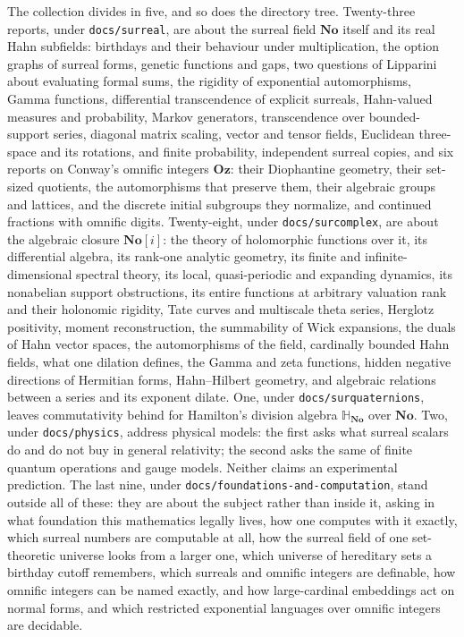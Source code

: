 \documentclass[11pt]{article}
\newcommand{\dir}[1]{\texttt{#1}}
\newcommand{\No}{\mathbf{No}}
\newcommand{\SC}{\mathbf{No}[i]}
\newcommand{\Oz}{\mathbf{Oz}}
\begin{document}
The collection divides in five, and so does the directory tree.  Twenty-three
reports, under \dir{docs/surreal}, are about the surreal field $\No$ itself and
its real Hahn subfields: birthdays and their behaviour under multiplication,
the option graphs of surreal forms, genetic functions and gaps, two questions
of Lipparini about evaluating formal sums, the rigidity of exponential
automorphisms, Gamma functions, differential transcendence of explicit
surreals, Hahn-valued measures and probability, Markov generators,
transcendence over bounded-support series, diagonal matrix scaling, vector
and tensor fields, Euclidean three-space and its rotations, and finite
probability, independent surreal copies, and six reports on Conway's omnific integers $\Oz$: their
Diophantine geometry, their set-sized quotients, the automorphisms that
preserve them, their algebraic groups and lattices, and the discrete initial
subgroups they normalize, and continued fractions with omnific digits.
Twenty-eight, under \dir{docs/surcomplex}, are about the algebraic closure $\SC$:
the theory of holomorphic functions over it, its differential algebra, its
rank-one analytic geometry, its finite and infinite-dimensional spectral
theory, its local, quasi-periodic and expanding dynamics, its nonabelian
support obstructions, its entire functions at arbitrary valuation rank and
their holonomic rigidity, Tate curves and multiscale theta series, Herglotz
positivity, moment reconstruction, the summability of Wick expansions,
the duals of Hahn vector spaces, the automorphisms of the field, cardinally
bounded Hahn fields, what one dilation defines, the Gamma and zeta functions,
hidden negative directions of Hermitian forms, Hahn--Hilbert geometry, and
algebraic relations between a series and its exponent dilate.  One, under
\dir{docs/surquaternions}, leaves
commutativity behind for Hamilton's division algebra $\mathbb{H}_{\No}$ over
$\No$.  Two, under \dir{docs/physics}, address physical models: the first asks what
surreal scalars do and do not buy in general relativity; the second asks the
same of finite quantum operations and gauge models. Neither claims an
experimental prediction.  The last nine, under
\dir{docs/foundations-and-computation}, stand outside all of these: they are
about the subject rather than inside it, asking in what foundation this
mathematics legally lives, how one computes with it exactly, which surreal
numbers are computable at all, how the surreal field of one set-theoretic
universe looks from a larger one, which universe of hereditary sets a
birthday cutoff remembers, which surreals and omnific integers are
definable, how omnific integers can be named exactly, and how large-cardinal
embeddings act on normal forms, and which restricted exponential languages
over omnific integers are decidable.
\end{document}
